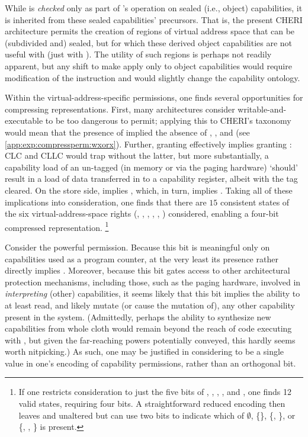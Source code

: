 While \cappermCInvoke* is {\em checked} only as part of 's
operation on sealed (i.e., object) capabilities, it is inherited from these
sealed capabilities' precursors.  That is, the present CHERI architecture
permits the creation of regions of virtual address space that can be
(subdivided and) sealed, but for which these derived object capabilities are
not useful with  (just with ).
The utility of such regions is perhaps not readily apparent, but any shift
to make \cappermCInvoke* apply only to object capabilities would require
modification of the  instruction and would slightly
change the capability ontology.

Within the virtual-address-specific permissions, one finds several
opportunities for compressing representations.  First, many architectures
consider writable-and-executable to be too dangerous to permit; applying
this to CHERI's taxonomy would mean that the presence of \cappermX* implied
the absence of \cappermS*, \cappermSC*, and \cappermSLC* (see
\cref{app:exp:compressperm:wxorx}).  Further, granting \cappermLC*
effectively implies granting \cappermL*:  CLC and CLLC would trap without
the latter, but more substantially, a capability load of an un-tagged (in
memory or via the paging hardware) `should' result in a load of data
transferred in to a capability register, albeit with the tag cleared.  On
the store side, \cappermSLC* implies \cappermSC*, which, in turn, implies
\cappermS*.  Taking all of these implications into consideration, one finds
that there are $15$ consistent states of the six virtual-address-space
rights (\cappermX*, \cappermL*, \cappermLC*, \cappermS*, \cappermSC*,
\cappermSLC*) considered, enabling a four-bit compressed representation.%
%
\footnote{If one restricts consideration to just the five bits of
\cappermL*, \cappermLC*, \cappermS*, \cappermSC*, and \cappermSLC*, one finds 12
valid states, requiring four bits.  A straightforward reduced encoding then
leaves \cappermL* and \cappermLC* unaltered but can use two bits to indicate
which of $\emptyset$, \{\cappermS*{}\}, \{\cappermSC*, \cappermS*{}\}, or
\{\cappermSLC*, \cappermSC*, \cappermS*{}\} is present.}

Consider the powerful \cappermASR permission.  Because this
bit is meaningful only on capabilities used as a program counter, at the
very least its presence rather directly implies \cappermX.  Moreover,
because this bit gates access to other architectural protection mechanisms,
including those, such as the paging hardware, involved in {\em interpreting}
(other) capabilities, it seems likely that this bit implies the ability to
at least read, and likely mutate (or cause the mutation of), any other
capability present in the system.  (Admittedly, perhaps the ability to
synthesize new capabilities from whole cloth would remain beyond the reach
of code executing with \cappermASR*, but given the far-reaching
powers potentially conveyed, this hardly seems worth nitpicking.)  As such,
one may be justified in considering \cappermASR* to be a single
value in one's encoding of capability permissions, rather than an orthogonal
bit.

